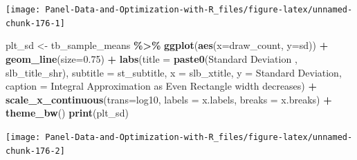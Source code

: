 \documentclass[
]{book}
\newenvironment{Shaded}{\begin{snugshade}}{\end{snugshade}}
\newcommand{\DataTypeTok}[1]{\textcolor[rgb]{0.13,0.29,0.53}{#1}}
\newcommand{\FloatTok}[1]{\textcolor[rgb]{0.00,0.00,0.81}{#1}}
\newcommand{\KeywordTok}[1]{\textcolor[rgb]{0.13,0.29,0.53}{\textbf{#1}}}
\newcommand{\NormalTok}[1]{#1}
\newcommand{\OperatorTok}[1]{\textcolor[rgb]{0.81,0.36,0.00}{\textbf{#1}}}
\newcommand{\StringTok}[1]{\textcolor[rgb]{0.31,0.60,0.02}{#1}}
\begin{document}
\begin{center}\texttt{[image: Panel-Data-and-Optimization-with-R\_files/figure-latex/unnamed-chunk-176-1]} \end{center}

\begin{Shaded}
\begin{Highlighting}[]
\NormalTok{plt\_sd \textless{}{-}}\StringTok{ }\NormalTok{tb\_sample\_means }\OperatorTok{\%\textgreater{}\%}
\StringTok{  }\KeywordTok{ggplot}\NormalTok{(}\KeywordTok{aes}\NormalTok{(}\DataTypeTok{x=}\NormalTok{draw\_count, }\DataTypeTok{y=}\NormalTok{sd)) }\OperatorTok{+}
\StringTok{  }\KeywordTok{geom\_line}\NormalTok{(}\DataTypeTok{size=}\FloatTok{0.75}\NormalTok{) }\OperatorTok{+}
\StringTok{  }\KeywordTok{labs}\NormalTok{(}\DataTypeTok{title =} \KeywordTok{paste0}\NormalTok{(}\StringTok{\textquotesingle{}Standard Deviation \textquotesingle{}}\NormalTok{, slb\_title\_shr),}
       \DataTypeTok{subtitle =}\NormalTok{ st\_subtitle,}
       \DataTypeTok{x =}\NormalTok{ slb\_xtitle,}
       \DataTypeTok{y =} \StringTok{\textquotesingle{}Standard Deviation\textquotesingle{}}\NormalTok{,}
       \DataTypeTok{caption =} \StringTok{\textquotesingle{}Integral Approximation as Even Rectangle width decreases\textquotesingle{}}\NormalTok{) }\OperatorTok{+}
\StringTok{  }\KeywordTok{scale\_x\_continuous}\NormalTok{(}\DataTypeTok{trans=}\StringTok{\textquotesingle{}log10\textquotesingle{}}\NormalTok{, }\DataTypeTok{labels =}\NormalTok{ x.labels, }\DataTypeTok{breaks =}\NormalTok{ x.breaks) }\OperatorTok{+}
\StringTok{  }\KeywordTok{theme\_bw}\NormalTok{()}
\KeywordTok{print}\NormalTok{(plt\_sd)}
\end{Highlighting}
\end{Shaded}

\begin{center}\texttt{[image: Panel-Data-and-Optimization-with-R\_files/figure-latex/unnamed-chunk-176-2]} \end{center}
\end{document}
